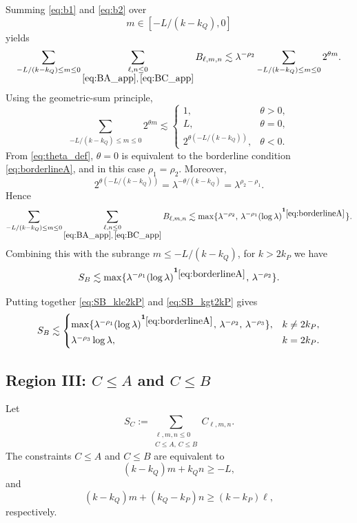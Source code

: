 \documentclass[10pt]{amsart}
\numberwithin{equation}{section}
\theoremstyle{definition}
\theoremstyle{remark}
\theoremstyle{remark}
\begin{document}
	\smallskip
	Summing \eqref{eq:b1} and \eqref{eq:b2} over
	\[
	m\in[-L/(k-k_Q),0]
	\]
	yields
	\begin{equation*}
		\sum_{-L/(k-k_Q)\le m\le 0}
		\sum_{\substack{\ell,n\le 0\\ \eqref{eq:BA_app},\,\eqref{eq:BC_app}}}
		B_{\ell,m,n}
		\lesssim
		\lambda^{-\rho_2}
		\sum_{-L/(k-k_Q)\le m\le 0}2^{\theta m}.
	\end{equation*}
	Using the geometric-sum principle,
	\[
	\sum_{-L/(k-k_Q)\le m\le 0}2^{\theta m}
	\lesssim
	\begin{cases}
		1,&\theta>0,\\
		L,&\theta=0,\\
		2^{\theta(-L/(k-k_Q))},&\theta<0.
	\end{cases}
	\]
	From \eqref{eq:theta_def}, $\theta=0$ is equivalent to the borderline condition \eqref{eq:borderlineA}, and in this case $\rho_1=\rho_2$.
	Moreover,
	\[
	2^{\theta(-L/(k-k_Q))}
	=
	\lambda^{-\theta/(k-k_Q)}
	=
	\lambda^{\rho_2-\rho_1}.
	\]
	Hence
	\[
	\sum_{-L/(k-k_Q)\le m\le 0}
	\sum_{\substack{\ell,n\le 0\\ \eqref{eq:BA_app},\,\eqref{eq:BC_app}}}
	B_{\ell,m,n}
	\lesssim
	\max\{\lambda^{-\rho_2},\,\lambda^{-\rho_1}(\log\lambda)^{\mathbf 1_{\eqref{eq:borderlineA}}}\}.
	\]
	Combining this with the subrange $m\le -L/(k-k_Q)$, for $k>2k_P$ we have
	\begin{equation}\label{eq:SB_kgt2kP}
		S_B\lesssim
		\max\{
		\lambda^{-\rho_1}(\log\lambda)^{\mathbf 1_{\eqref{eq:borderlineA}}},
		\,\lambda^{-\rho_2}
		\}.
	\end{equation}
	
	Putting together \eqref{eq:SB_kle2kP} and \eqref{eq:SB_kgt2kP} gives
	\begin{equation}\label{eq:SB_final_rig}
		S_B\lesssim
		\begin{cases}
			\max\{\lambda^{-\rho_1}(\log\lambda)^{\mathbf 1_{\eqref{eq:borderlineA}}},\,\lambda^{-\rho_2},\,\lambda^{-\rho_3}\},&k\neq 2k_P,\\[2pt]
			\lambda^{-\rho_3}\log\lambda,&k=2k_P.
		\end{cases}
	\end{equation}



    
	\subsection{Region III: $C\le A$ and $C\le B$}
	
	Let
	\[
	S_C:=\sum_{\substack{\ell,m,n\le0\\ C\le A,\,C\le B}}C_{\ell,m,n}.
	\]
	The constraints $C\le A$ and $C\le B$ are equivalent to
	\begin{equation}\label{eq:CA_app}
		(k-k_Q)m+k_Q n\ge -L,
	\end{equation}
	and
	\begin{equation}\label{eq:CB_app}
		(k-k_Q)m+(k_Q-k_P)n\ge (k-k_P)\ell,
	\end{equation}
	respectively.
	
\end{document}
